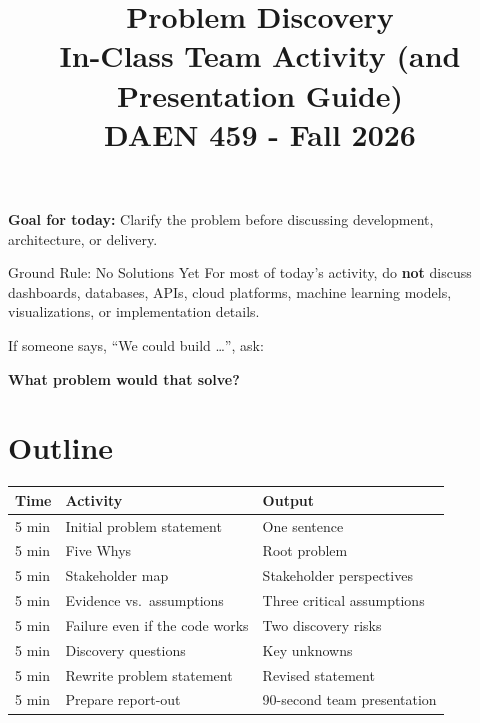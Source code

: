 \documentclass[11pt]{article}
\title{\textbf{Problem Discovery}\\
\large In-Class Team Activity (and Presentation Guide)\\
DAEN 459 - Fall 2026}
\author{}
\date{}
\begin{document}
\maketitle

\vspace{-5em}

\begin{center}
\textbf{Goal for today:} Clarify the problem before discussing development, architecture, or delivery.
\end{center}

\begin{activitybox}{Ground Rule: No Solutions Yet}
For most of today's activity, do \textbf{not} discuss dashboards, databases, APIs, cloud platforms, machine learning models, visualizations, or implementation details.

If someone says, ``We could build \ldots'', ask:

\begin{center}
\textbf{What problem would that solve?}
\end{center}
\end{activitybox}

\section*{Outline}

\begin{center}
\begin{tabularx}{\textwidth}{p{} X p{}}
\toprule
\textbf{Time} & \textbf{Activity} & \textbf{Output} \\
\midrule
5 min & Initial problem statement & One sentence \\
5 min & Five Whys & Root problem \\
5 min & Stakeholder map & Stakeholder perspectives \\
5 min & Evidence vs.\ assumptions & Three critical assumptions \\
5 min & Failure even if the code works & Two discovery risks \\
5 min & Discovery questions & Key unknowns \\
5 min & Rewrite problem statement & Revised statement \\
5 min & Prepare report-out & 90-second team presentation \\
\bottomrule
\end{tabularx}
\end{center}
\end{document}
